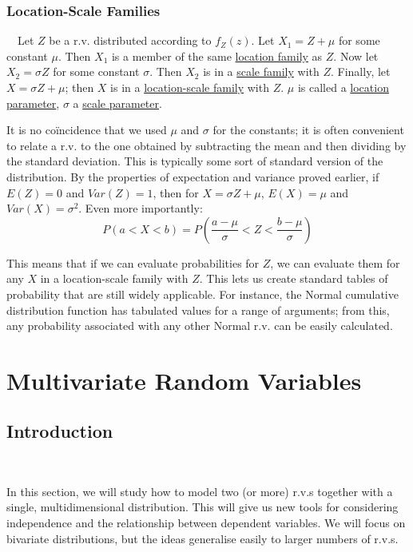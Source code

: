 \documentclass[12pt,a4paper]{article}
\begin{document}
\subsubsection{Location-Scale Families}

$\quad$Let $Z$ be a r.v. distributed according to $f_Z(z)$. Let $X_1 = Z+\mu$ for some constant $\mu$. Then $X_1$ is a member of the same \underline{location family} as $Z$. Now let $X_2 = \sigma Z$ for some constant $\sigma$. Then $X_2$ is in a \underline{scale family} with $Z$. Finally, let $X = \sigma Z + \mu$; then $X$ is in a \underline{location-scale family} with $Z$. $\mu$ is called a \underline{location parameter}, $\sigma$ a \underline{scale parameter}.

It is no co\"incidence that we used $\mu$ and $\sigma$ for the constants; it is often convenient to relate a r.v. to the one obtained by subtracting the mean and then dividing by the standard deviation. This is typically some sort of standard version of the distribution. By the properties of expectation and variance proved earlier, if $E(Z) = 0$ and $Var(Z) = 1$, then for $X=\sigma Z + \mu$, $E(X) = \mu$ and $Var(X) = \sigma^2$. Even more importantly:
$$P(a<X<b) = P\left(\frac{a-\mu}{\sigma}<Z<\frac{b-\mu}{\sigma}\right)$$

This means that if we can evaluate probabilities for $Z$, we can evaluate them for any $X$ in a location-scale family with $Z$. This lets us create standard tables of probability that are still widely applicable. For instance, the Normal cumulative distribution function has tabulated values for a range of arguments; from this, any probability associated with any other Normal r.v. can be easily calculated.

\clearpage
\section{Multivariate Random Variables}

\subsection{Introduction}$\;$

In this section, we will study how to model two (or more) r.v.s together with a single, multidimensional distribution. This will give us new tools for considering independence and the relationship between dependent variables. We will focus on bivariate distributions, but the ideas generalise easily to larger numbers of r.v.s.
\end{document}
